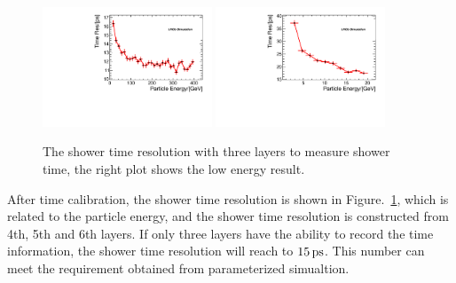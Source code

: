 \begin{figure}[!thbp]
\centering
\includegraphics[width=0.45\textwidth]{Figures/06_ECAL/time_cali_res/shower_time_res_6.pdf}
\includegraphics[width=0.45\textwidth]{Figures/06_ECAL/time_cali_res/shower_time_res_6_low_energy.pdf}
\caption{The shower time resolution with three layers to measure shower time, 
the right plot shows the low energy result.} 
\label{fig:time_shower_res}
\end{figure}

After time calibration, 
the shower time resolution is shown in Figure.~\ref{fig:time_shower_res},
which is related to the particle energy,
and the shower time resolution is constructed from 4th, 5th and 6th layers.
If only three layers have the ability to record the time information, 
the shower time resolution will reach to $15\text{\,ps}$.
This number can meet the requirement obtained from parameterized simualtion. 

